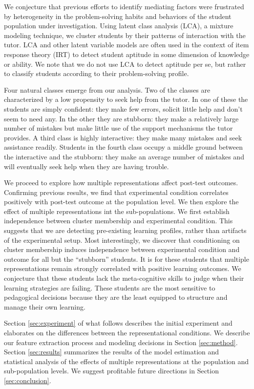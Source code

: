 \documentclass{edm_template}
\begin{document}
We conjecture that previous efforts to identify mediating factors were frustrated by heterogeneity in the problem-solving habits and behaviors of the student population under investigation. Using latent class analysis (LCA), a mixture modeling technique, we cluster students by their patterns of interaction with the tutor. LCA and other latent variable models  are often used in the context of item response theory (IRT) \cite{Linden1997} to detect student aptitude in some dimension of knowledge or ability. We note that we do not use LCA to detect aptitude per se, but rather to classify students according to their problem-solving profile.

Four natural classes emerge from our analysis. Two of the classes are characterized by a low propensity to seek help from the tutor. In one of these the students are simply confident: they make few errors, solicit little help and don't seem to need any. In the other they are stubborn: they make a relatively large number of mistakes but make little use of the support mechanisms the tutor provides. A third class is highly interactive: they make many mistakes and seek assistance readily. Students in the fourth class occupy a middle ground between the interactive and the stubborn: they make an average number of mistakes and will eventually seek help when they are having trouble.

We proceed to explore how multiple representations affect post-test outcomes. Confirming previous results, we find that experimental condition correlates positively with post-test outcome at the population level. We then explore the effect of multiple representations int the sub-populations. We first establish independence between cluster membership and experimental condition. This suggests that we are detecting pre-existing learning profiles, rather than artifacts of the experimental setup. Most interestingly, we discover that conditioning on cluster membership induces independence between experimental condition and outcome for all but the ``stubborn'' students. It is for these students that multiple representations remain strongly correlated with positive learning outcomes. We conjecture that these students lack the meta-cognitive skills to judge when their learning strategies are failing. These students are the most sensitive to pedagogical decisions because they are the least equipped to structure and manage their own learning. 

Section \ref{sec:experiment} of what follows describes the initial experiment and elaborates on the differences between the representational conditions. We describe our feature extraction process and modeling decisions in Section \ref{sec:method}. Section \ref{sec:results} summarizes the results of the model estimation and statistical analysis of the effects of multiple representations at the population and sub-population levels. We  suggest profitable future directions in Section \ref{sec:conclusion}.
\end{document}
